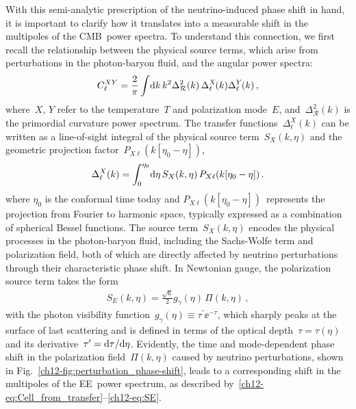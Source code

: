 With this semi-analytic prescription of the neutrino-induced phase shift in hand, it is important to clarify how it translates into a measurable shift in the multipoles of the CMB~power spectra. To understand this connection, we first recall the relationship between the physical source terms, which arise from perturbations in the photon-baryon fluid, and the angular power spectra:
\begin{equation}
	C^{XY}_\ell = \frac{2}{\pi} \int\! \mathrm{d} k\, k^2 \Delta^2_{\mathcal{R}}(k) \,\Delta^X_\ell\hskip-1pt(k)\Delta^Y_\ell\hskip-1pt(k)\, ,	\label{ch12-eq:Cell_from_transfer}
\end{equation}
where~$X,\,Y$ refer to the temperature~$T$ and polarization mode~$E$, and~$\Delta^2_{\mathcal{R}}(k)$ is the primordial curvature power spectrum. The transfer functions~$\Delta^X_\ell(k)$ can be written as a line-of-sight integral of the physical source term~$S_X(k,\eta)$ and the geometric projection factor~$P_{X\ell}(k[\eta_0-\eta])$,
\begin{equation}
	\Delta^X_\ell(k) = \int_0^{\eta_0}\! \mathrm{d}\eta\,S_X(k,\eta)\,P_{X\ell}(k[\eta_0-\eta])\, .	\label{ch12-eq:transfers_from_sources}
\end{equation}
where $\eta_0$ is the conformal time today and $P_{X\ell}(k[\eta_0-\eta])$~represents the projection from Fourier to harmonic space, typically expressed as a combination of spherical Bessel functions. The source term~$S_X(k,\eta)$ encodes the physical processes in the photon-baryon fluid, including the Sachs-Wolfe term and polarization field, both of which are directly affected by neutrino perturbations through their characteristic phase shift. In Newtonian gauge, the polarization source term takes the form~\cite{Hu:1997hp}
\begin{align}
	S_E(k,\eta) = \frac{\sqrt{6}}{2} g_\gamma(\eta)\, \Pi(k,\eta)\, ,	\label{ch12-eq:SE}
\end{align}
with the photon visibility function~$g_\gamma(\eta) \equiv \tau^\prime \ee^{-\tau}$, which sharply peaks at the surface of last scattering and is defined in terms of the optical depth~$\tau = \tau(\eta)$ and its derivative~$\tau^\prime = \mathrm{d}\tau/\mathrm{d}\eta$. Evidently, the time and mode-dependent phase shift in the polarization field~$\Pi(k,\eta)$ caused by neutrino perturbations, shown in Fig.~\ref{ch12-fig:perturbation_phase-shift}, leads to a corresponding shift in the multipoles of the EE~power spectrum, as described by~\mbox{\eqref{ch12-eq:Cell_from_transfer}--\eqref{ch12-eq:SE}}.

